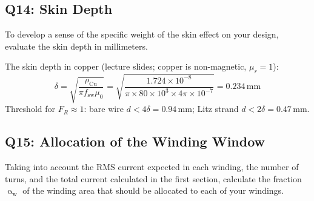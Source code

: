 \documentclass{PELsmallreport}
\begin{document}
\subsection{Q14: Skin Depth} 
To develop a sense of the specific weight of the skin effect on your design, evaluate the skin depth in millimeters.

\begin{framed}
The skin depth in copper (lecture slides; copper is non-magnetic, $\mu_r=1$):
\begin{equation}
    \delta = \sqrt{\frac{\rho_\mathrm{Cu}}{\pi f_\mathrm{sw} \mu_0}}
    = \sqrt{\frac{1.724\!\times\!10^{-8}}{\pi\times80\!\times\!10^3\times4\pi\!\times\!10^{-7}}} = 0.234\,\mathrm{mm}
\end{equation}
Threshold for $F_R\approx1$: bare wire $d < 4\delta=0.94\,\mathrm{mm}$; Litz strand $d < 2\delta=0.47\,\mathrm{mm}$.
\end{framed}

 \hfill{}








\subsection{Q15: Allocation of the Winding Window} 
Taking into account the RMS current expected in each winding, the number of turns, and the total current calculated in the first section, calculate the fraction $\upalpha_\mathrm{w}$ of the winding area that should be allocated to each of your windings. 
\end{document}
